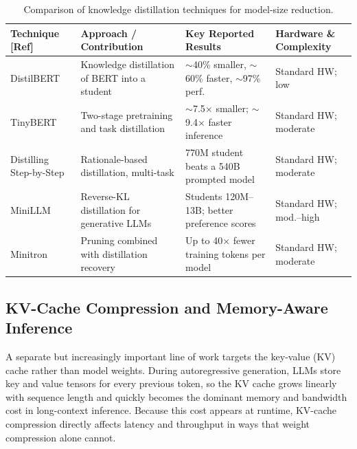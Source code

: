 \begin{table}[htbp]
\centering
\scriptsize
\caption{Comparison of knowledge distillation techniques for model-size reduction.}
\label{tab:lr-kd}
\renewcommand{\arraystretch}{1.2}
\begin{tabular}{p{}p{}p{}p{}}
\hline
\textbf{Technique [Ref]} & \textbf{Approach / Contribution} & \textbf{Key Reported Results} & \textbf{Hardware \& Complexity} \\
\hline
DistilBERT \cite{sanh2020distilbert} & Knowledge distillation of BERT into a student & $\sim$40\% smaller, $\sim$60\% faster, $\sim$97\% perf. & Standard HW; low \\
TinyBERT \cite{jiao2020tinybert} & Two-stage pretraining and task distillation & $\sim$7.5$\times$ smaller; $\sim$9.4$\times$ faster inference & Standard HW; moderate \\
Distilling Step-by-Step \cite{hsieh2023distilling} & Rationale-based distillation, multi-task & 770M student beats a 540B prompted model & Standard HW; moderate \\
MiniLLM \cite{gu2024minillm} & Reverse-KL distillation for generative LLMs & Students 120M--13B; better preference scores & Standard HW; mod.--high \\
Minitron \cite{muralidharan2024minitron} & Pruning combined with distillation recovery & Up to 40$\times$ fewer training tokens per model & Standard HW; moderate \\
\hline
\end{tabular}
\end{table}

\subsection{KV-Cache Compression and Memory-Aware Inference}

A separate but increasingly important line of work targets the key-value (KV) cache rather than model weights. During autoregressive generation, LLMs store key and value tensors for every previous token, so the KV cache grows linearly with sequence length and quickly becomes the dominant memory and bandwidth cost in long-context inference. Because this cost appears at runtime, KV-cache compression directly affects latency and throughput in ways that weight compression alone cannot.


